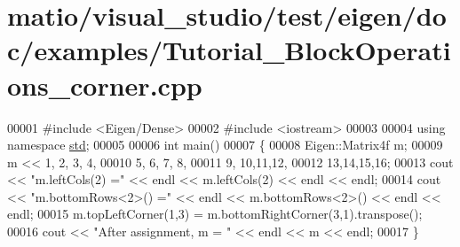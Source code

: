\hypertarget{matio_2visual__studio_2test_2eigen_2doc_2examples_2_tutorial___block_operations__corner_8cpp_source}{}\section{matio/visual\+\_\+studio/test/eigen/doc/examples/\+Tutorial\+\_\+\+Block\+Operations\+\_\+corner.cpp}
\label{matio_2visual__studio_2test_2eigen_2doc_2examples_2_tutorial___block_operations__corner_8cpp_source}

\begin{DoxyCode}
00001 \textcolor{preprocessor}{#include <Eigen/Dense>}
00002 \textcolor{preprocessor}{#include <iostream>}
00003 
00004 \textcolor{keyword}{using namespace }\hyperlink{namespacestd}{std};
00005 
00006 \textcolor{keywordtype}{int} main()
00007 \{
00008   Eigen::Matrix4f m;
00009   m << 1, 2, 3, 4,
00010        5, 6, 7, 8,
00011        9, 10,11,12,
00012        13,14,15,16;
00013   cout << \textcolor{stringliteral}{"m.leftCols(2) ="} << endl << m.leftCols(2) << endl << endl;
00014   cout << \textcolor{stringliteral}{"m.bottomRows<2>() ="} << endl << m.bottomRows<2>() << endl << endl;
00015   m.topLeftCorner(1,3) = m.bottomRightCorner(3,1).transpose();
00016   cout << \textcolor{stringliteral}{"After assignment, m = "} << endl << m << endl;
00017 \}
\end{DoxyCode}
